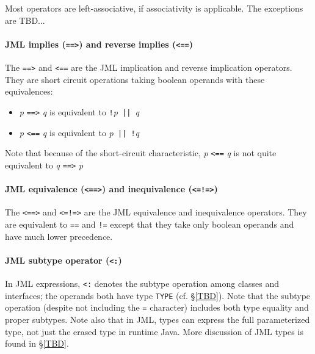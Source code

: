Most operators are left-associative, if associativity is applicable. The exceptions are TBD...


\paragraph{JML implies (\texttt{==>}) and reverse implies (\texttt{<==})}
\label{JMLimplies}

The \texttt{==>} and \texttt{<==} are the JML implication and reverse implication operators. They are short circuit operations taking boolean operands with these equivalences:
\begin{itemize}[noitemsep,nolistsep]
\item \textit{p} \texttt{==>} \textit{q} is equivalent to \texttt{!}\textit{p}\texttt{ || }\textit{q}
\item \textit{p} \texttt{<==} \textit{q} is equivalent to \textit{p}\texttt{ || }\texttt{!}\textit{q}
\end{itemize}
Note that because of the short-circuit characteristic, \textit{p} \texttt{<==} \textit{q} is not quite equivalent to \textit{q} \texttt{==>} \textit{p}

\paragraph{JML equivalence (\texttt{<==>}) and inequivalence (\texttt{<=!=>})}
\label{JMLequivalence}

The \texttt{<==>} and \texttt{<=!=>} are the JML equivalence and inequivalence operators. They are equivalent to 
\texttt{==} and \texttt{!=} except that they take only boolean operands and have much lower precedence.

\paragraph{JML subtype operator (\texttt{<:})}
\label{JMLsubtype}
In JML expressions, \texttt{<:} denotes the subtype operation among classes and interfaces; the operands both have type \texttt{\bs TYPE} (cf. \S\ref{TBD}). Note that the subtype operation (despite not including the \texttt{=} character) includes both type equality and proper subtypes. Note also that in JML, types can express the full parameterized type, not just the erased type in runtime Java. More discussion of JML types is found in \S\ref{TBD}.

